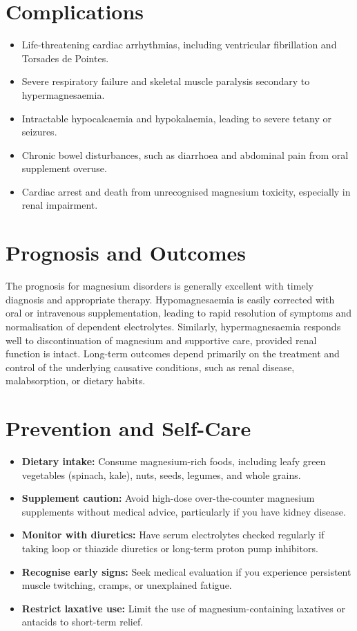 \section*{Complications}
\begin{itemize}
    \item Life-threatening cardiac arrhythmias, including ventricular fibrillation and Torsades de Pointes.
    \item Severe respiratory failure and skeletal muscle paralysis secondary to hypermagnesaemia.
    \item Intractable hypocalcaemia and hypokalaemia, leading to severe tetany or seizures.
    \item Chronic bowel disturbances, such as diarrhoea and abdominal pain from oral supplement overuse.
    \item Cardiac arrest and death from unrecognised magnesium toxicity, especially in renal impairment.
\end{itemize}

\section*{Prognosis and Outcomes}
The prognosis for magnesium disorders is generally excellent with timely diagnosis and appropriate therapy. Hypomagnesaemia is easily corrected with oral or intravenous supplementation, leading to rapid resolution of symptoms and normalisation of dependent electrolytes. Similarly, hypermagnesaemia responds well to discontinuation of magnesium and supportive care, provided renal function is intact. Long-term outcomes depend primarily on the treatment and control of the underlying causative conditions, such as renal disease, malabsorption, or dietary habits.

\section*{Prevention and Self-Care}
\begin{itemize}
    \item \textbf{Dietary intake:} Consume magnesium-rich foods, including leafy green vegetables (spinach, kale), nuts, seeds, legumes, and whole grains.
    \item \textbf{Supplement caution:} Avoid high-dose over-the-counter magnesium supplements without medical advice, particularly if you have kidney disease.
    \item \textbf{Monitor with diuretics:} Have serum electrolytes checked regularly if taking loop or thiazide diuretics or long-term proton pump inhibitors.
    \item \textbf{Recognise early signs:} Seek medical evaluation if you experience persistent muscle twitching, cramps, or unexplained fatigue.
    \item \textbf{Restrict laxative use:} Limit the use of magnesium-containing laxatives or antacids to short-term relief.
\end{itemize}

